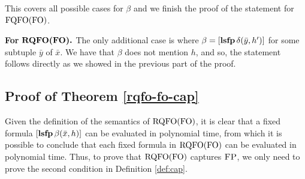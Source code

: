 This covers all possible cases for $\beta$ and we finish the proof of the statement for ${\rm FQFO}({\rm FO})$.

\vspace{1em}
{\bf For} $\boldsymbol{{\rm RQFO}({\rm FO}).}$ The only additional case is where $\beta = [{\bf lsfp} \, \delta(\bar{y},h')]$ for some subtuple $\bar{y}$ of $\bar{x}$. We have that $\beta$ does not mention $h$, and so, the statement follows directly as we showed in the previous part of the proof.


\subsection*{Proof of Theorem \ref{rqfo-fo-cap}}

Given the definition of the semantics of ${\rm RQFO}({\rm FO})$, it is clear that a fixed formula $[{\bf lsfp} \, \beta(\bar{x}, h)]$ can be evaluated in polynomial time, from which it is possible to conclude that each fixed formula in ${\rm RQFO}({\rm FO})$ can be evaluated in polynomial time. Thus, to prove that ${\rm RQFO}({\rm FO})$ captures $\text{\sc FP}$, we only need to prove the second condition in Definition \ref{def:cap}.
%
